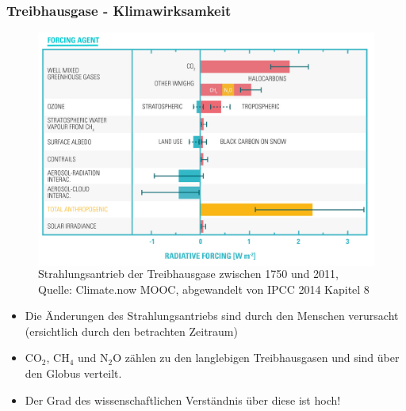 \begin{frame}
	\frametitle{Treibhausgase - Klimawirksamkeit}
		\begin{figure}
			\begin{columns}
				\includegraphics[width=0.9\linewidth]{bilder/radiative_forcing_CCnow_mooc.jpg}
				\caption{Strahlungsantrieb der Treibhausgase zwischen 1750 und 2011, Quelle: Climate.now MOOC, abgewandelt von IPCC 2014 Kapitel 8}
			\end{columns}
		\end{figure}
\begin{itemize}
	\item Die Änderungen des Strahlungsantriebs sind durch den Menschen verursacht (ersichtlich durch den betrachten Zeitraum)
	\item CO$_2$, CH$_4$ und N$_2$O zählen zu den langlebigen Treibhausgasen und sind über den Globus verteilt.
	\item Der Grad des wissenschaftlichen Verständnis über diese ist hoch!
\end{itemize}
\note{
  \begin{itemize}

\end{itemize}}
\end{frame}
